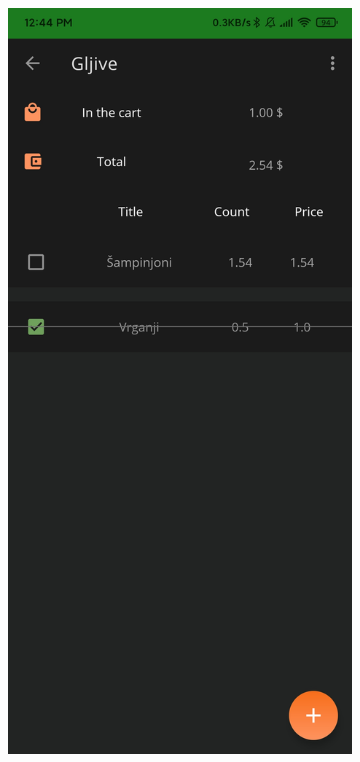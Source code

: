     \begin{figure}
        \centering
        \begin{subfigure}{0.49\textwidth}
            \centering
            \includegraphics[width = \textwidth]{slike/Informerlab.jpg}

\end{subfigure}
\end{figure}
